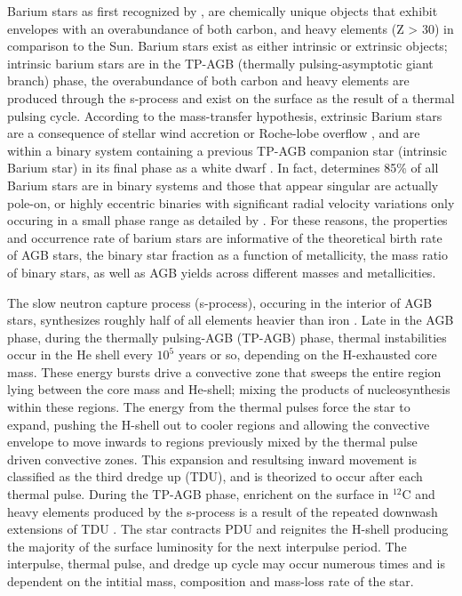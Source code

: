 \documentclass[a4paper,fleqn,usenatbib]{mnras}
\begin{document}
Barium stars as first recognized by \citet{Bidelman1951}, are chemically unique objects that exhibit envelopes with an overabundance of both carbon, and heavy elements (Z > 30) in comparison to the Sun. Barium stars exist as either intrinsic or extrinsic objects; intrinsic barium stars are in the TP-AGB (thermally pulsing-asymptotic giant branch) phase, the overabundance of both carbon and heavy elements are produced through the s-process and exist on the surface as the result of a thermal pulsing cycle. According to the mass-transfer hypothesis, extrinsic Barium stars are a consequence of stellar wind accretion \citep{boffin1988,jorissen1992} or Roche-lobe overflow \citep{webbink1986}, and are within a binary system containing a previous TP-AGB companion star (intrinsic Barium star) in its final phase as a white dwarf \citep{bohm1980,bohm1984}. In fact, \citet{mcclure1983} determines 85\% of all Barium stars are in binary systems and those that appear singular are actually pole-on, or highly eccentric binaries with significant radial velocity variations only occuring in a small phase range as detailed by \citet{pourbaix2004}. For these reasons, the properties and occurrence rate of barium stars are informative of the theoretical birth rate of AGB stars, the binary star fraction as a function of metallicity, the mass ratio of binary stars, as well as AGB yields across different masses and metallicities. 

The slow neutron capture process (s-process), occuring in the interior of AGB stars, synthesizes roughly half of all elements heavier than iron \citep[e.g.][]{busso1999,travaglio2001,herwig2005,romano2010,kobayashi2011,prantzos2012,bisterzo2014,karakas12016}. Late in the AGB phase, during the thermally pulsing-AGB (TP-AGB) phase, thermal instabilities occur in the He shell every $10^5$ years or so, depending on the H-exhausted core mass. These energy bursts drive a convective zone that sweeps the entire region lying between the core mass and He-shell; mixing the products of nucleosynthesis within these regions. The energy from the thermal pulses force the star to expand, pushing the H-shell out to cooler regions and allowing the convective envelope to move inwards to regions previously mixed by the thermal pulse driven convective zones. This expansion and resultsing inward movement is classified as the third dredge up (TDU), and is theorized to occur after each thermal pulse. During the TP-AGB phase, enrichent on the surface in $^{12}$C and heavy elements produced by the s-process is a result of the repeated downwash extensions of TDU \citep[e.g.][]{busso2001}. The star contracts PDU and reignites the H-shell producing the majority of the surface luminosity for the next interpulse period. The interpulse, thermal pulse, and dredge up cycle may occur numerous times and is dependent on the intitial mass, composition and mass-loss rate of the star.
\end{document}
